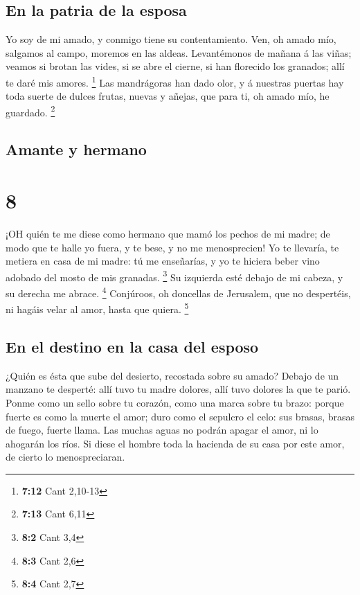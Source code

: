 \hypertarget{en-la-patria-de-la-esposa}{%
\subsection{En la patria de la esposa}\label{en-la-patria-de-la-esposa}}

 Yo soy de mi amado, y conmigo tiene su contentamiento.
 Ven, oh amado mío, salgamos al campo, moremos en las
aldeas.  Levantémonos de mañana á las viñas; veamos si
brotan las vides, si se abre el cierne, si han florecido los granados;
allí te daré mis amores. \footnote{\textbf{7:12} Cant 2,10-13}
 Las mandrágoras han dado olor, y á nuestras puertas hay
toda suerte de dulces frutas, nuevas y añejas, que para ti, oh amado
mío, he guardado. \footnote{\textbf{7:13} Cant 6,11}

\hypertarget{amante-y-hermano}{%
\subsection{Amante y hermano}\label{amante-y-hermano}}

\hypertarget{section-7}{%
\section{8}\label{section-7}}

 ¡OH quién te me diese como hermano que mamó los pechos de
mi madre; de modo que te halle yo fuera, y te bese, y no me
menosprecien!  Yo te llevaría, te metiera en casa de mi
madre: tú me enseñarías, y yo te hiciera beber vino adobado del mosto de
mis granadas. \footnote{\textbf{8:2} Cant 3,4}  Su izquierda
esté debajo de mi cabeza, y su derecha me abrace. \footnote{\textbf{8:3}
  Cant 2,6}  Conjúroos, oh doncellas de Jerusalem, que no
despertéis, ni hagáis velar al amor, hasta que quiera. \footnote{\textbf{8:4}
  Cant 2,7}

\hypertarget{en-el-destino-en-la-casa-del-esposo}{%
\subsection{En el destino en la casa del
esposo}\label{en-el-destino-en-la-casa-del-esposo}}

 ¿Quién es ésta que sube del desierto, recostada sobre su
amado? Debajo de un manzano te desperté: allí tuvo tu madre dolores,
allí tuvo dolores la que te parió.  Ponme como un sello
sobre tu corazón, como una marca sobre tu brazo: porque fuerte es como
la muerte el amor; duro como el sepulcro el celo: sus brasas, brasas de
fuego, fuerte llama.  Las muchas aguas no podrán apagar el
amor, ni lo ahogarán los ríos. Si diese el hombre toda la hacienda de su
casa por este amor, de cierto lo menospreciaran.

